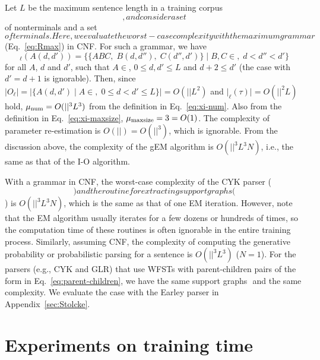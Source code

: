 \documentclass[english]{jnlp_1.4_rep}
\newcommand{\tuple}[1]{}
\newcommand{\Vn}{}
\newcommand{\Vt}{}
\newcommand{\dto}{}
\newcommand{\subtrees}{}
\newcommand{\corpus}{}
\newcommand{\Rmax}{}
\newcommand{\proc}[1]{}
\begin{document}
Let $L$ be the maximum sentence
length in a training corpus $\corpus$, and consider a set
$\Vn$ of nonterminals and a set $\Vt$ of terminals.
Here, we evaluate the worst-case complexity with the maximum
grammar $\Rmax$ (Eq.~\ref{eq:Rmax}) in CNF.
For such a grammar, we have
\begin{equation}
\subtrees_\ell(A(d,d'))=
	\bigl\{\{A\dto BC,\;B(d,d''),\;C(d'',d')\}\;\big|\;
		B,C\in \Vn,\;d<d''<d'\bigr\}
\label{eq:possible-psi}
\end{equation}
for all $A$, $d$ and $d'$, such that $A\in\Vn$, $0\le d, d'\le L$
and $d+2\le d'$ (the case with $d'=d+1$ is ignorable).  Then, since
$|O_\ell|=\bigl|\{A(d,d')\mid A\in\Vn,\;0\le d<d'\le L\}\bigr|
=O(|\Vn|L^2)$ and $\big|\subtrees_\ell(\tau)\big|=O(|\Vn|^2 L)$
hold, $\mu_{\rm num}=O(|\Vn|^3 L^3)$ from the definition
in Eq.~\ref{eq:xi-num}.  Also from the definition
in Eq.~\ref{eq:xi-maxsize}, $\mu_{\rm maxsize}=3=O(1)$.
The complexity of parameter re-estimation is $O(|\Rmax|)=O(|\Vn|^3)$,
which is ignorable.
From the discussion above, the complexity of the gEM algorithm
is $O(|\Vn|^3 L^3 N)$, i.e., the same as that of the I-O algorithm.

With a grammar in CNF, the worst-case
complexity of the CYK parser ($\proc{CYK-Parser}$) and
the routine for extracting support graphs ($\proc{Extract-CYK}$)
is $O(|\Vn|^3 L^3 N)$, which is the same as that of one EM iteration.
However, note that the EM algorithm usually iterates
for a few dozens or hundreds of times,
so the computation time of these routines is often ignorable
in the entire training process.  Similarly, assuming CNF, the complexity
of computing the generative probability or probabilistic parsing
for a sentence is $O(|\Vn|^3L^3)$ ($N=1$).  For the parsers
(e.g., CYK and GLR) that use WFSTs with parent-children pairs
of the form in Eq.~\ref{eq:parent-children}, we have the same 
support graphs $\tuple{O_\ell,\subtrees_\ell}$ and the same
complexity.  We evaluate the case with the Earley parser
in Appendix~\ref{sec:Stolcke}.


\section{Experiments on training time}
\label{sec:experiment}
\end{document}
